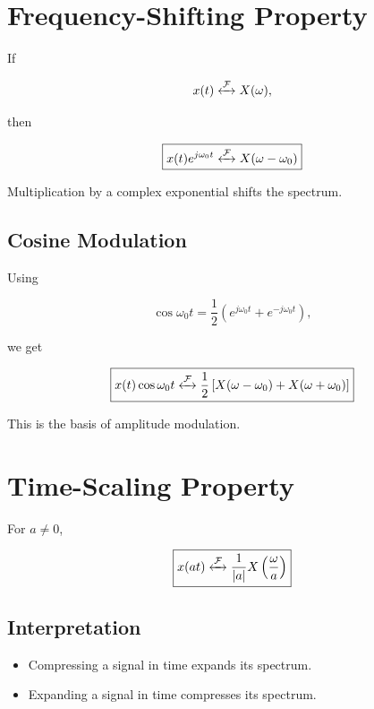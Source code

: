 
\section{Frequency-Shifting Property}

If

\[
x(t)\xleftrightarrow{\mathcal{F}}X(\omega),
\]

then

\[
\boxed{
x(t)e^{j\omega_0 t}
\xleftrightarrow{\mathcal{F}}
X(\omega-\omega_0)
}
\]

Multiplication by a complex exponential shifts the spectrum.


\subsection{Cosine Modulation}

Using

\[
\cos\omega_0 t=
\frac{1}{2}
\left(
e^{j\omega_0 t}+e^{-j\omega_0 t}
\right),
\]

we get

\[
\boxed{
x(t)\cos\omega_0 t
\xleftrightarrow{\mathcal{F}}
\frac{1}{2}
\left[
X(\omega-\omega_0)+X(\omega+\omega_0)
\right]
}
\]

This is the basis of amplitude modulation.


\section{Time-Scaling Property}

For \(a\neq0\),

\[
\boxed{
x(at)
\xleftrightarrow{\mathcal{F}}
\frac{1}{|a|}X\left(\frac{\omega}{a}\right)
}
\]


\subsection{Interpretation}

\begin{itemize}
\item Compressing a signal in time expands its spectrum.
\item Expanding a signal in time compresses its spectrum.
\end{itemize}

